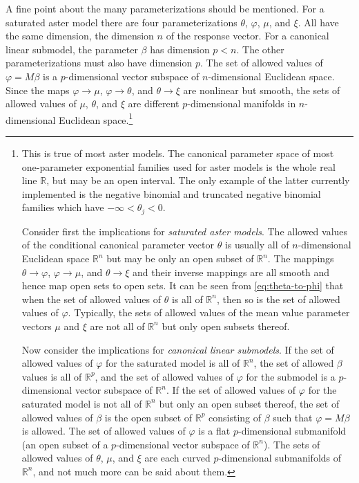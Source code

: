\documentclass[11pt]{article}
\newcommand{\real}{\mathbb{R}}
\begin{document}
A fine point about the many parameterizations should be mentioned.
For a saturated aster model there are four parameterizations
$\theta$, $\varphi$, $\mu$, and $\xi$.  All have the same dimension, the
dimension $n$ of the response vector.  For a canonical linear submodel,
the parameter $\beta$ has dimension $p < n$.  The other parameterizations
must also have dimension $p$.  The set of allowed values of $\varphi = M \beta$
is a $p$-dimensional vector subspace
of $n$-dimensional Euclidean space.
Since the maps $\varphi \to \mu$, $\varphi \to \theta$, and $\theta \to \xi$
are nonlinear but smooth, the sets of allowed values of $\mu$, $\theta$, and
$\xi$ are different $p$-dimensional manifolds in $n$-dimensional Euclidean
space.\footnote{This is true of most aster models.
The canonical parameter space of most one-parameter exponential families used
for aster models is the whole real line $\real$, but may be an open interval.
The only example of the latter currently implemented
is the negative binomial and truncated negative binomial
families which have $- \infty < \theta_j < 0$.

Consider first the implications for \emph{saturated aster models}.
The allowed values of the conditional canonical parameter vector $\theta$
is usually all of $n$-dimensional Euclidean space $\real^n$ but may be only
an open subset of $\real^n$.  The mappings $\theta \to \varphi$,
$\varphi \to \mu$, and $\theta \to \xi$ and their inverse mappings are all
smooth and hence map open sets to open sets.  It can be seen from \eqref{eq:theta-to-phi} that when the set of allowed values of $\theta$ is all of $\real^n$,
then so is the set of allowed values of $\varphi$.
Typically, the sets of allowed values of the mean value parameter vectors
$\mu$ and $\xi$ are not all of $\real^n$ but only open subsets thereof.

Now consider the implications for \emph{canonical linear submodels}.
If the set of allowed values of $\varphi$ for the saturated model is all
of $\real^n$, the set of allowed $\beta$ values is all of $\real^p$,
and the set of allowed values of $\varphi$ for the submodel is a
$p$-dimensional vector subspace of $\real^n$.
If the set of allowed values of $\varphi$ for the saturated model is not all
of $\real^n$ but only an open subset thereof,
the set of allowed values of $\beta$
is the open subset of $\real^p$ consisting of $\beta$ such that
$\varphi = M \beta$ is allowed.
The set of allowed values of $\varphi$ is a flat $p$-dimensional submanifold
(an open subset of a $p$-dimensional vector subspace of $\real^n$).
The sets of allowed values of $\theta$, $\mu$, and $\xi$ are each curved
$p$-dimensional submanifolds of $\real^n$, and not much more can be said about
them.

}
\end{document}
